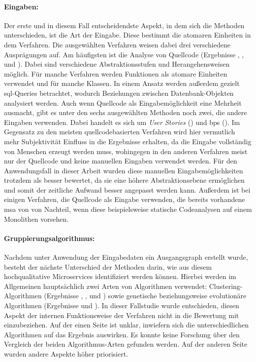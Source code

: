 \paragraph{Eingaben:} Der erste und in diesem Fall entscheidendste Aspekt, in dem sich die Methoden unterschieden, ist die Art der Eingabe.
Diese bestimmt die atomaren Einheiten in dem Verfahren.
Die ausgewählten Verfahren weisen dabei drei verschiedene Ausprägungen auf.
Am häufigsten ist die Analyse von Quellcode (Ergebnisse , ,  und ).
Dabei sind verschiedene Abstraktionsstufen und Her\-an\-ge\-hens\-wei\-sen möglich.
Für manche Verfahren werden Funktionen als atomare Einheiten verwendet und für manche Klassen.
In einem Ansatz werden außerdem gezielt \gls{sql}-Queries betrachtet, wodurch Beziehungen zwischen Datenbank-Objekten analysiert werden.
Auch wenn Quellcode als Eingabemöglichkeit eine Mehrheit ausmacht, gibt es unter den sechs ausgewählten Methoden noch zwei, die andere Eingaben verwenden.
Dabei handelt es sich um \emph{User Stories} () und \glspl{bp} ().
Im Gegensatz zu den meisten quellcodebasierten Verfahren wird hier vermutlich mehr Subjektivität Einfluss in die Ergebnisse erhalten, da die Eingabe vollständig von Menschen erzeugt werden muss, wohingegen in den anderen Verfahren meist nur der Quellcode und keine manuellen Eingaben verwendet werden.
Für den Anwendungsfall in dieser Arbeit wurden diese manuellen Eingabemöglichkeiten trotzdem als besser bewertet, da sie eine höhere Abstraktionsebene ermöglichen und somit der zeitliche Aufwand besser angepasst werden kann.
Außerdem ist bei einigen Verfahren, die Quellcode als Eingabe verwenden, die bereits vorhandene \gls{msa} von \jf von Nachteil, wenn diese beispielsweise statische Codeanalysen auf einem Monolithen vorsehen.

\paragraph{Gruppierungsalgorithmus:}
Nachdem unter Anwendung der Eingabedaten ein Ausgangsgraph erstellt wurde, besteht der nächste Unterschied der Methoden darin, wie aus diesem hochqualitative Microservices identifiziert werden können.
Hierbei werden im Allgemeinen hauptsächlich zwei Arten von Algorithmen verwendet: Clustering-Algorithmen (Ergebnisse , ,  und ) sowie genetische beziehungsweise evolutionäre Algorithmen (Ergebnisse  und ).
In dieser Fallstudie wurde entschieden, diesen Aspekt der internen Funktionsweise der Verfahren nicht in die Bewertung mit einzubeziehen.
Auf der einen Seite ist unklar, inwiefern sich die unterschiedlichen Algorithmen auf das Ergebnis auswirken.
Es konnte keine Forschung über den Vergleich der beiden Algorithmus-Arten gefunden werden.
Auf der anderen Seite wurden andere Aspekte höher priorisiert.

